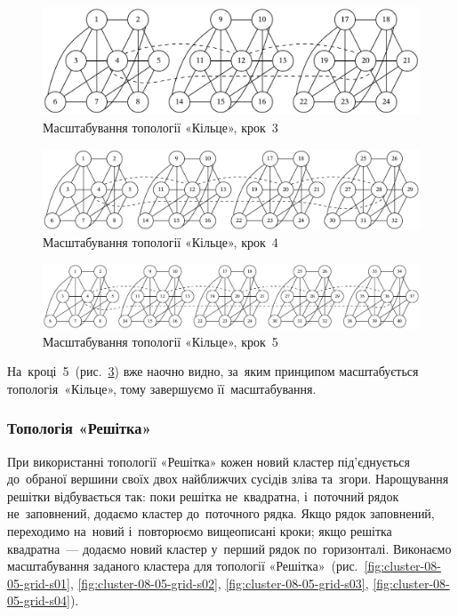 \documentclass[
	a4paper,
	oneside,
	BCOR = 10mm,
	DIV = 12,
	12pt,
	headings = normal,
]{scrartcl}
\begin{document}
				\begin{figure}[!htbp]
					\centering
					\includegraphics[height=6\baselineskip]{./assets/cluster-08-04-ring-s03.pdf}
					\caption{Масштабування топології «Кільце», крок~3}
					\label{fig:cluster-08-04-ring-s03}
				\end{figure}

				\begin{figure}[!htbp]
					\centering
					\includegraphics[width=\columnwidth]{./assets/cluster-08-04-ring-s04.pdf}
					\caption{Масштабування топології «Кільце», крок~4}
					\label{fig:cluster-08-04-ring-s04}
				\end{figure}

				\begin{figure}[!htbp]
					\centering
					\includegraphics[width=\columnwidth]{./assets/cluster-08-04-ring-s05.pdf}
					\caption{Масштабування топології «Кільце», крок~5}
					\label{fig:cluster-08-04-ring-s05}
				\end{figure}

				На~кроці~5~(рис.~\ref{fig:cluster-08-04-ring-s05}) вже наочно видно, за~яким принципом масштабується топологія~«Кільце», тому завершуємо її~масштабування.

			\subsubsection{Топологія «Решітка»}
				При використанні топології «Решітка» кожен новий кластер під'єднується до~обраної вершини своїх двох найближчих сусідів зліва та~згори. Нарощування решітки відбувається так: поки решітка не~квадратна, і~поточний рядок не~заповнений, додаємо кластер до~поточного рядка. Якщо рядок заповнений, переходимо на~новий і~повторюємо вищеописані кроки; якщо решітка квадратна~— додаємо новий кластер у~перший рядок по~горизонталі. Виконаємо масштабування заданого кластера для топології «Решітка»~(рис.~\ref{fig:cluster-08-05-grid-s01}, \ref{fig:cluster-08-05-grid-s02}, \ref{fig:cluster-08-05-grid-s03}, \ref{fig:cluster-08-05-grid-s04}).
\end{document}

